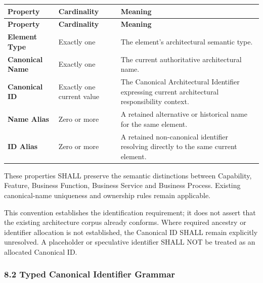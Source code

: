\label{rad:metamodel:325}
\begingroup\small\setlength{\TableWidth}{\dimexpr\linewidth-6\tabcolsep-4\arrayrulewidth\relax}
\begin{longtable}{|>{\raggedright\arraybackslash}p{0.24\TableWidth}|>{\raggedright\arraybackslash}p{0.33\TableWidth}|>{\raggedright\arraybackslash}p{0.43\TableWidth}|}
\hline\rowcolor{TableHead}\textbf{Property} & \textbf{Cardinality} & \textbf{Meaning}\\\hline\endfirsthead
\hline\rowcolor{TableHead}\textbf{Property} & \textbf{Cardinality} & \textbf{Meaning}\\\hline\endhead
\hline\endfoot
\textbf{Element Type} & Exactly one & The element's architectural semantic type.\\\hline
\textbf{Canonical Name} & Exactly one & The current authoritative architectural name.\\\hline
\textbf{Canonical ID} & Exactly one current value & The Canonical Architectural Identifier expressing current architectural responsibility context.\\\hline
\textbf{Name Alias} & Zero or more & A retained alternative or historical name for the same element.\\\hline
\textbf{ID Alias} & Zero or more & A retained non-canonical identifier resolving directly to the same current element.\\\hline
\end{longtable}\endgroup
{}\label{rad:metamodel:333}

These properties SHALL preserve the semantic distinctions between Capability, Feature, Business Function, Business Service and Business Process. Existing canonical-name uniqueness and ownership rules remain applicable.

\label{rad:metamodel:335}

This convention establishes the identification requirement; it does not assert that the existing architecture corpus already conforms. Where required ancestry or identifier allocation is not established, the Canonical ID SHALL remain explicitly unresolved. A placeholder or speculative identifier SHALL NOT be treated as an allocated Canonical ID.

\label{rad:metamodel:337}
\subsubsection*{8.2 Typed Canonical Identifier Grammar}
\label{rad:metamodel:339}

